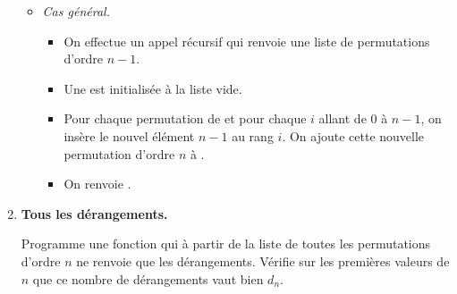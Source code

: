 \documentclass[11pt,class=report,crop=false]{standalone}
\begin{document}
\begin{activite}[Dérangements]
\begin{enumerate}
\begin{algorithme}
\begin{itemize}
   \item \emph{Cas général.}
    \begin{itemize}      
      \item On effectue un appel récursif  qui renvoie une liste  de permutations d'ordre $n-1$.
      \item Une  est initialisée à la liste vide.
      
      \item Pour chaque permutation de  et pour chaque $i$ allant de $0$ à $n-1$, on insère le nouvel élément $n-1$ au rang $i$. On ajoute cette nouvelle permutation d'ordre $n$ à .

      \item On renvoie .
    \end{itemize}
  \end{itemize}
 \end{algorithme} 
 
 \item \textbf{Tous les dérangements.}
 
 Programme une fonction  qui à partir de la liste de toutes les permutations d'ordre $n$ ne renvoie que les dérangements. 
 Vérifie sur les premières valeurs de $n$ que ce nombre de dérangements vaut bien $d_n$.
  
\end{enumerate}

\end{activite}


\end{document}
